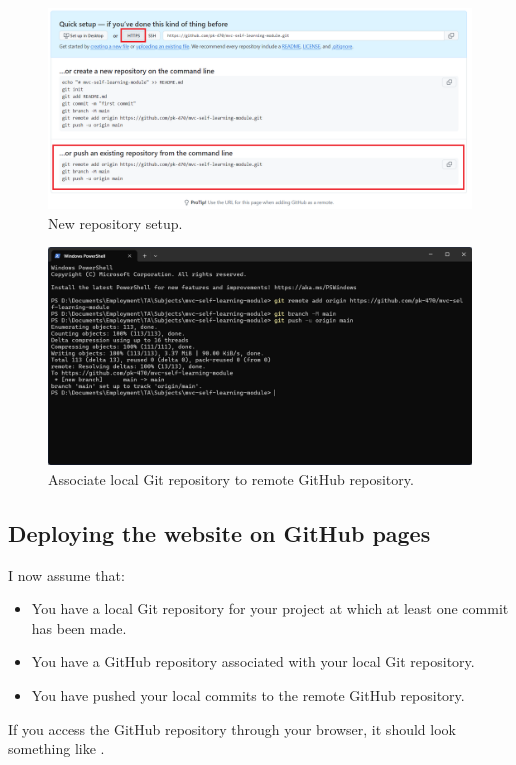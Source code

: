 \documentclass[a4paper,10pt]{article}
\begin{document}
\begin{figure}[htbp]
    \centering
    \includegraphics[width=\textwidth]{new_repository_setup.png}
    \caption{New repository setup.}
    \label{fig:new_repository_setup}   
\end{figure}

\begin{figure}[htbp]
    \centering
    \includegraphics[width=\textwidth]{git_remote_add_origin.png}
    \caption{Associate local Git repository to remote GitHub repository.}
    \label{fig:git_remote_add_origin}   
\end{figure}

\subsection{Deploying the website on GitHub pages}

I now assume that:
\begin{itemize}
    \item You have a local Git repository for your project at which at least one commit has been made.
    \item You have a GitHub repository associated with your local Git repository.
    \item You have pushed your local commits to the remote GitHub repository.
\end{itemize}
If you access the GitHub repository through your browser, it should look something like .
\end{document}
